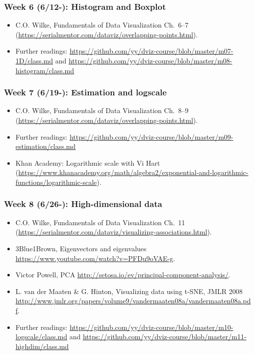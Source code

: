 \subsubsection{Week 6 (6/12-): Histogram and Boxplot }%

\begin{itemize}\itemsep0em 
\item C.O. Wilke, Fundamentals of Data Visualization Ch.~6--7 (\url{https://serialmentor.com/dataviz/overlapping-points.html}). 
\item Further readings: \url{https://github.com/yy/dviz-course/blob/master/m07-1D/class.md} and \url{https://github.com/yy/dviz-course/blob/master/m08-histogram/class.md}
\end{itemize}	
\subsubsection{Week 7 (6/19-): Estimation and logscale }%

\begin{itemize}\itemsep0em 
\item C.O. Wilke, Fundamentals of Data Visualization Ch.~8--9 (\url{https://serialmentor.com/dataviz/overlapping-points.html}). 
\item Further readings: \url{https://github.com/yy/dviz-course/blob/master/m09-estimation/class.md}
\item Khan Academy: Logarithmic scale with Vi Hart (\url{https://www.khanacademy.org/math/algebra2/exponential-and-logarithmic-functions/logarithmic-scale}). 
\end{itemize}	
\subsubsection{Week 8 (6/26-): High-dimensional data }%

\begin{itemize}\itemsep0em 
\item C.O. Wilke, Fundamentals of Data Visualization Ch.~11 (\url{https://serialmentor.com/dataviz/visualizing-associations.html}). 
\item 3Blue1Brown, Eigenvectors and eigenvalues \url{https://www.youtube.com/watch?v=PFDu9oVAE-g}. 
\item Victor Powell, PCA \url{http://setosa.io/ev/principal-component-analysis/}.
\item L. van der Maaten \& G. Hinton, Visualizing data using t-SNE, JMLR 2008 \url{http://www.jmlr.org/papers/volume9/vandermaaten08a/vandermaaten08a.pdf}.
\item Further readings: \url{https://github.com/yy/dviz-course/blob/master/m10-logscale/class.md} and \url{https://github.com/yy/dviz-course/blob/master/m11-highdim/class.md}
\end{itemize}	

